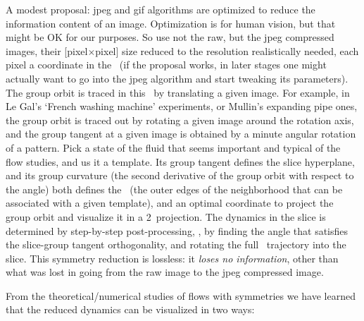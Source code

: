 A modest proposal: jpeg and gif algorithms are optimized to reduce
the information content of an image. Optimization is for human vision,
but that might be OK for our purposes. So use not the raw, but the jpeg
compressed images, their [pixel$\times$pixel] size reduced to the
resolution realistically needed, each pixel a coordinate in the \statesp\
(if the proposal works, in later stages one might actually want to go into the jpeg algorithm and
start tweaking its parameters).
The group orbit is traced in this \statesp\ by translating a given image.
For example, in Le Gal's `French washing machine' experiments, or Mullin's
expanding pipe ones, the group orbit is traced out by rotating a given
image around the rotation axis, and the group tangent at a given image is
obtained by a minute angular rotation of a pattern. Pick a state of the
fluid that seems important and typical of the flow studies, and us it a
template. Its group tangent defines the slice hyperplane, and its group
curvature (the second derivative of the group orbit with respect to the
angle) both defines the \sset\ (the outer edges of the neighborhood that can be
associated with a given template), and an optimal coordinate to project
the group orbit and visualize it in a 2\dmn\ projection. The dynamics in
the slice is determined by step-by-step post-processing, \ie, by finding
the angle that satisfies the slice-group tangent orthogonality, and
rotating the full \statesp\ trajectory into the slice. This symmetry reduction is
lossless: it \emph{loses no information}, other than what was lost in
going from the raw image to the jpeg compressed image.

From the theoretical/numerical studies of flows with symmetries%
\rf{SCD07,ACHKW11}
we have learned that the reduced dynamics can be visualized in two ways:

